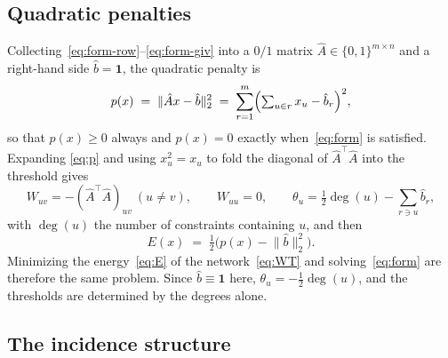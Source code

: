 \documentclass{easychair}
\begin{document}
\subsection{Quadratic penalties}\label{sec:pen}

Collecting~\eqref{eq:form-row}--\eqref{eq:form-giv} into a $0/1$ matrix
$\hat A \in \{0,1\}^{m\times n}$ and a right-hand side $\hat b = \mathbf{1}$, the quadratic penalty is
\begin{equation}\label{eq:p}
  p(x) \;=\; \lVert \hat Ax - \hat b\rVert_2^2
        \;=\; \sum_{r=1}^{m}\Bigl(\textstyle\sum_{u\in r}x_u - \hat b_r\Bigr)^{2},
\end{equation}
so that $p(x) \ge 0$ always and $p(x) = 0$ exactly when~\eqref{eq:form} is satisfied. Expanding
\eqref{eq:p} and using $x_u^2 = x_u$ to fold the diagonal of $\hat A^{\top}\!\hat A$ into the
threshold gives
\begin{equation}\label{eq:WT}
  W_{uv} = -(\hat A^{\top}\!\hat A)_{uv} \ (u \neq v), \qquad
  W_{uu} = 0, \qquad
  \theta_u = \tfrac12\deg(u) - \textstyle\sum_{r \ni u} \hat b_r ,
\end{equation}
with $\deg(u)$ the number of constraints containing $u$, and then
\begin{equation}\label{eq:Ep}
  E(x) \;=\; \tfrac12\bigl(p(x) - \lVert \hat b\rVert_2^2\bigr) .
\end{equation}
Minimizing the energy~\eqref{eq:E} of the network~\eqref{eq:WT} and solving~\eqref{eq:form} are
therefore the same problem. Since $\hat b \equiv \mathbf{1}$ here, $\theta_u = -\tfrac12\deg(u)$, and
the thresholds are determined by the degrees alone.

\subsection{The incidence structure}\label{sec:inc}
\end{document}
